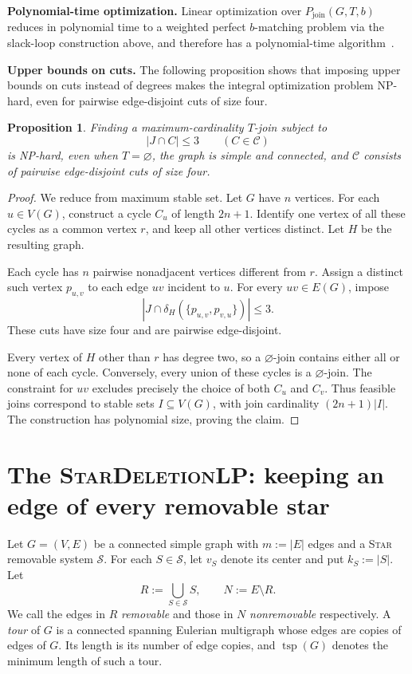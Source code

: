 \documentclass[11pt]{amsart}
\newcommand{\1}{\mathbbm{1}}
\newcommand{\LPone}{\textsc{StarDeletionLP}}
\newtheorem{proposition}[theorem]{Proposition}
\begin{document}
\textbf{Polynomial-time optimization.}
Linear optimization over $P_{\mathrm{join}}(G,T,b)$ reduces in
polynomial time to a weighted perfect $b$-matching problem via the
slack-loop construction above, and therefore has a polynomial-time
algorithm~\cite{EdmondsJohnson}. 

\textbf{Upper bounds on cuts.}
The following proposition shows that imposing upper bounds on
cuts instead of degrees makes the integral optimization problem
NP-hard, even for pairwise edge-disjoint cuts of size four.

\begin{proposition}\label{prop:cut-bounded-joins-hardness}
Finding a maximum-cardinality $T$-join subject to
\[
 |J\cap C|\le3\qquad(C\in\mathcal C)
\]
is NP-hard, even when $T=\varnothing$, the graph is simple
and connected, and $\mathcal C$ consists of pairwise
edge-disjoint cuts of size four.
\end{proposition}

\begin{proof}
We reduce from maximum stable set. Let $G$ have $n$ vertices.
For each $u\in V(G)$, construct a cycle $C_u$ of length
$2n+1$. Identify one vertex of all these cycles as a common
vertex $r$, and keep all other vertices distinct. Let $H$
be the resulting graph.

Each cycle has $n$ pairwise nonadjacent vertices different
from $r$. Assign a distinct such vertex $p_{u,v}$ to each
edge $uv$ incident to $u$. For every $uv\in E(G)$, impose
\[
 |J\cap\delta_H(\{p_{u,v},p_{v,u}\})|\le3.
\]
These cuts have size four and are pairwise edge-disjoint.

Every vertex of $H$ other than $r$ has degree two, so a
$\varnothing$-join contains either all or none of each cycle.
Conversely, every union of these cycles is a $\varnothing$-join.
The constraint for $uv$ excludes precisely the choice of both
$C_u$ and $C_v$. Thus feasible joins correspond to stable sets
$I\subseteq V(G)$, with join cardinality $(2n+1)|I|$.
The construction has polynomial size, proving the claim.
\end{proof}

\section{The \LPone: keeping an edge of every removable star}
\label{subsec:framework-1}



Let $G=(V,E)$ be a connected simple graph with $m:=|E|$ edges
and a \textsc{Star} removable system $\mathcal S$. For each $S\in\mathcal S$,
let $v_S$ denote its center and put $k_S:=|S|$. Let
\[
    R:=\bigcup_{S\in\mathcal S}S,
    \qquad
    N:=E\setminus R.
\]
We call the edges in $R$ \emph{removable} and those in $N$
\emph{nonremovable} respectively.
A \emph{tour} of $G$ is a connected spanning Eulerian multigraph
whose edges are copies of edges of $G$. Its length is its number
of edge copies, and $\operatorname{tsp}(G)$ denotes the minimum
length of such a tour.
\end{document}
